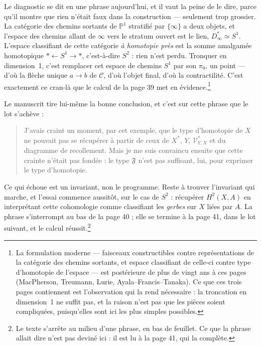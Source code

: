 \documentclass[11pt,a4paper]{article}
\begin{document}
Le diagnostic se dit en une phrase aujourd'hui, et il vaut la peine de le dire,
parce qu'il montre que rien n'était faux dans la construction — seulement trop
grossier. La catégorie des chemins sortants de $\mathbb{P}^{1}$ stratifié par
$\{\infty\}$ a deux objets, et l'espace des chemins allant de $\infty$ vers le
stratum ouvert est le lien, $D^{*}_{\infty} \simeq S^{1}$. L'espace classifiant
de cette catégorie \emph{à homotopie près} est la somme amalgamée homotopique
$\ast \leftarrow S^{1} \to \ast$, c'est-à-dire $S^{2}$ : rien n'est perdu.
Tronquer en dimension~1, c'est remplacer cet espace de chemins $S^{1}$ par son
$\pi_{0}$, un point — d'où la flèche unique $a \to b$ de $\mathcal{C}$, d'où
l'objet final, d'où la contractilité. C'est exactement ce cran-là que le calcul
de la page 39 met en évidence.\footnote{La formulation moderne — faisceaux
constructibles contre représentations de la catégorie des chemins sortants,
et espace classifiant de celle-ci contre type d'homotopie de l'espace — est
postérieure de plus de vingt ans à ces pages (MacPherson, Treumann, Lurie,
Ayala--Francis--Tanaka). Ce que ces trois pages contiennent est l'observation qui
la rend nécessaire : la troncation en dimension~1 ne suffit pas, et la
raison n'est pas que les pièces soient compliquées, puisqu'elles sont ici les
plus simples possibles.}

Le manuscrit tire lui-même la bonne conclusion, et c'est sur cette phrase que le
lot s'achève :

\begin{quote}
J'avais craint un moment, par cet exemple, que le type d'homotopie de $X$ ne
pouvait pas se récupérer à partir de ceux de $X^{*}$, $Y$,
$\mathcal{V}^{*}_{Y,X}$ et du diagramme de recollement. Mais je me suis
convaincu ensuite que cette crainte n'était pas fondée : le type $\mathfrak{F}$
n'est pas suffisant, lui, pour exprimer le type d'homotopie.
\end{quote}

Ce qui échoue est un invariant, non le programme. Reste à trouver l'invariant
qui marche, et l'essai commence aussitôt, sur le cas de $S^{2}$ : récupérer
$H^{2}(X,A)$ en interprétant cette cohomologie comme classifiant les
\emph{gerbes} sur $X$ liées par $A$. La phrase s'interrompt au bas de la page
40 ; elle se termine à la page 41, dans le lot suivant, et le calcul
réussit.\footnote{Le texte s'arrête au milieu d'une phrase, en bas de feuillet.
Ce que la phrase allait dire n'est pas deviné ici : il est lu à la page 41, qui
la complète.}
\end{document}
